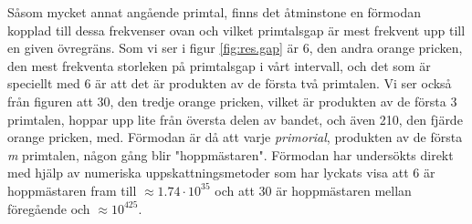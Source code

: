 Såsom mycket annat angående primtal, finns det åtminstone en förmodan kopplad till dessa frekvenser ovan och vilket primtalsgap är mest frekvent upp till en given övregräns. 
Som vi ser i figur \ref{fig:res.gap} är 6, den andra orange pricken, den mest frekventa storleken på primtalsgap i vårt intervall, och det som är speciellt med 6 är att det är produkten av de första två primtalen. 
Vi ser också från figuren att 30, den tredje orange pricken, vilket är produkten av de första 3 primtalen, hoppar upp lite från översta delen av bandet, och även 210, den fjärde orange pricken, med. Förmodan är då att varje \textit{primorial}, produkten av de första \textit{m} primtalen, någon gång blir "hoppmästaren".
Förmodan har undersökts direkt med hjälp av numeriska uppskattningsmetoder \cite{primeGap} som har lyckats visa att 6 är hoppmästaren fram till \(\approx 1.74\cdot10^{35}\) och att 30 är hoppmästaren mellan föregående och \(\approx 10^{425}\).

